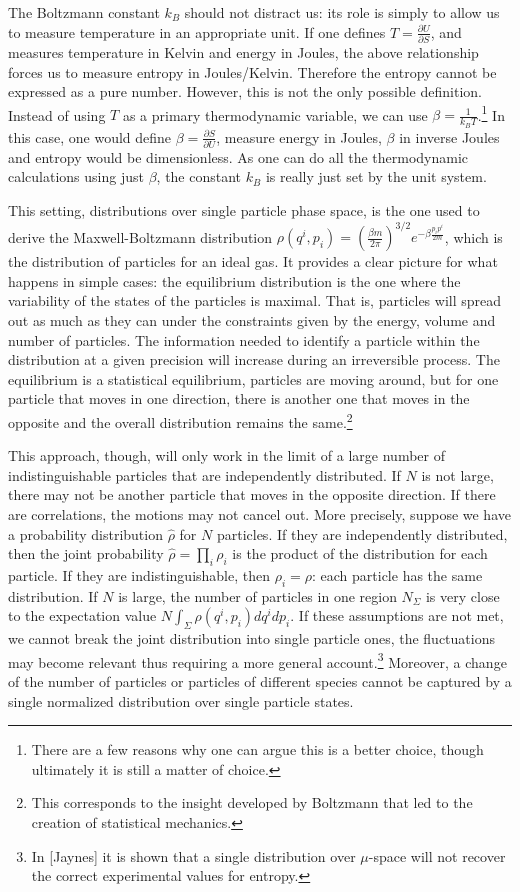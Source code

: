 \documentclass{article}
\begin{document}
The Boltzmann constant $k_B$ should not distract us: its role is simply to allow us to measure temperature in an appropriate unit. If one defines $T = \frac{\partial U}{\partial S}$, and measures temperature in Kelvin and energy in Joules, the above relationship forces us to measure entropy in Joules/Kelvin. Therefore the entropy cannot be expressed as a pure number. However, this is not the only possible definition. Instead of using $T$ as a primary thermodynamic variable, we can use $\beta = \frac{1}{k_B T}$.\footnote{There are a few reasons why one can argue this is a better choice, though ultimately it is still a matter of choice.} In this case, one would define $\beta = \frac{\partial S}{\partial U}$, measure energy in Joules, $\beta$ in inverse Joules and entropy would be dimensionless. As one can do all the thermodynamic calculations using just $\beta$, the constant $k_B$ is really just set by the unit system.

This setting, distributions over single particle phase space, is the one used to derive the Maxwell-Boltzmann distribution $\rho(q^i, p_i) = \left(\frac{\beta m}{2\pi} \right)^{3/2}e^{-\beta \frac{p_ip^i}{2m}}$, which is the distribution of particles for an ideal gas. It provides a clear picture for what happens in simple cases: the equilibrium distribution is the one where the variability of the states of the particles is maximal. That is, particles will spread out as much as they can under the constraints given by the energy, volume and number of particles. The information needed to identify a particle within the distribution at a given precision will increase during an irreversible process. The equilibrium is a statistical equilibrium, particles are moving around, but for one particle that moves in one direction, there is another one that moves in the opposite and the overall distribution remains the same.\footnote{This corresponds to the insight developed by Boltzmann that led to the creation of statistical mechanics.}

This approach, though, will only work in the limit of a large number of indistinguishable particles that are independently distributed. If $N$ is not large, there may not be another particle that moves in the opposite direction. If there are correlations, the motions may not cancel out. More precisely, suppose we have a probability distribution $\hat{\rho}$ for $N$ particles. If they are independently distributed, then the joint probability $\hat{\rho}=\prod_{i}\rho_i$ is the product of the distribution for each particle. If they are indistinguishable, then $\rho_i=\rho$: each particle has the same distribution. If $N$ is large, the number of particles in one region $N_\Sigma$ is very close to the expectation value $N\int_\Sigma \rho(q^i, p_i)dq^idp_i$. If these assumptions are not met, we cannot break the joint distribution into single particle ones, the fluctuations may become relevant thus requiring a more general account.\footnote{In [Jaynes] it is shown that a single distribution over $\mu$-space will not recover the correct experimental values for entropy.} Moreover, a change of the number of particles or particles of different species cannot be captured by a single normalized distribution over single particle states.
\end{document}
